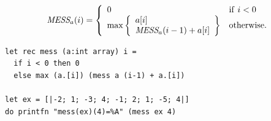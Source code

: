 \documentclass[rgb]{beamer}
\begin{document}
\begin{frame}[fragile]
\begin{footnotesize}

  \vspace{1ex}

  \[
  \mbox{\it{MESS}}_a(i) = \left \{ \begin{array}{ll} 0 & \mathrm{if}~i < 0 \\
    \mathrm{max} \left \{ \begin{array}{l} a[i] \\
                                           \mbox{\it{MESS}}_a(i-1)+a[i]
                          \end{array} \right \} & \mathrm{otherwise}. \end{array} \right .
  \]

  \vspace{1ex}

  \vspace{1ex}

\begin{lstlisting}[numbers=none,frame=none,mathescape]
let rec mess (a:int array) i =
  if i < 0 then 0
  else max (a.[i]) (mess a (i-1) + a.[i])

let ex = [|-2; 1; -3; 4; -1; 2; 1; -5; 4|]
do printfn "mess(ex)(4)=%A" (mess ex 4)
\end{lstlisting}

\end{footnotesize}
\end{frame}
\end{document}
